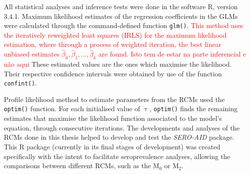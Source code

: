 All statistical analyses and inference tests were done in the software R, version 3.4.1.
Maximum likelihood estimates of the regression coefficients in the GLMs were calculated through the command-defined function \texttt{glm()}.
\textcolor{red}{This method uses the iteratively reweighted least squares (IRLS) for the maximum likelihood estimation, where through a process of weighted iteration, the best linear unbiased estimates $\hat{\beta}_0,\hat{\beta}_1,\dots,\hat{\beta}_k$ are found. Isto tem de estar na parte inferencial e não aqui}
These estimated values are the ones which maximise the likelihood.
Their respective confidence intervals were obtained by use of the function \texttt{confint()}.

Profile likelihood method to estimate parameters from the RCMs used the \texttt{optim()} function.
For each initialised value of $\uptau$, \texttt{optim()} finds the remaining estimates that maximise the likelihood function associated to the model's equation, through consecutive iterations.
The developments and analyses of the RCMs done in this thesis helped to develop and test the \emph{SERO-AID} package.
This R package (currently in its final stages of development) was created specifically with the intent to facilitate seroprevalence analyses, allowing the comparisons between different RCMs, such as the M$_0$ or M$_2$.